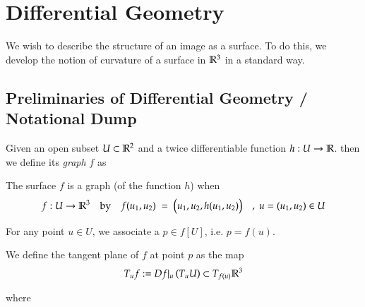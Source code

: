 	
	

\section{Differential Geometry}


We wish to describe the structure of an image as a surface. To do this, we develop the notion of curvature of a surface in $\mathbb{R}^3$ in a standard way. 
        \subsection{Preliminaries of Differential Geometry / Notational Dump}
        
        
        
        Given an open subset $U\subset \mathbb{R}^2$ and a twice differentiable function  $h: U \to \mathbb{R}$.
        then we define its \textit{graph} $f$ as
        
        \begin{defn} \label{defn:graph}
        The surface $f$ is a graph (of the function $h$) when 
        \[
	        f: U \to \mathbb{R}^3 \quad \textrm{by} \quad f(u_1, u_2) \;=\; \big(u_1 , u_2 , h(u_1,u_2)\big)
	        \quad,\; u = (u_1, u_2) \in U \]
        \end{defn}
        
        For any point $u \in U$, we associate a $p \in f[U]$, i.e. $p = f(u)$.
        
        \begin{defn} \label{defn:tangent plane}
        	
        	We define the tangent plane of $f$ at point $p$ as the map
        \[
        T_u f := Df\vert_u \left(T_u U\right) \subset T_{f(u)} \mathbb{R}^3
        \]
    \end{defn}
        where 
                
